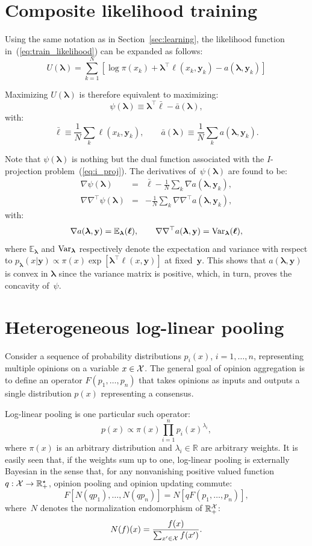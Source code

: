\documentclass[english]{scrartcl}
\def\y{{\mathbf{y}}}
\newcommand{\blambda}{{\boldsymbol{\lambda}}}
\newcommand{\bell}{{\boldsymbol{\ell}}}
\newcommand{\E}{\mathbb{E}}
\begin{document}
\section{Composite likelihood training}
\label{app:training}

Using the same notation as in Section~\ref{sec:learning}, the likelihood function in~(\ref{eq:train_likelihood}) can be expanded as follows:
$$
U(\blambda) 
= \sum_{k=1}^N \left[
\log \pi(x_k) + \blambda^\top \bell(x_k, \y_k) - a(\blambda,\y_k)
\right]
$$

Maximizing $U(\blambda)$ is therefore equivalent to maximizing: 
$$
\psi(\blambda) \equiv \blambda^\top \bar{\bell} - \bar{a}(\blambda), 
$$
with:
$$
\bar{\bell} \equiv \frac{1}{N} \sum_k \bell(x_k,\y_k),
\qquad
\bar{a}(\blambda) \equiv \frac{1}{N} \sum_k a(\blambda,\y_k).
$$

Note that $\psi(\blambda)$ is nothing but the dual function associated with the $I$-projection problem~(\ref{eq:i_proj}). The derivatives of~$\psi(\blambda)$ are found to be:
\begin{eqnarray*}
\nabla\psi(\blambda)
 & = & \bar{\bell} - \frac{1}{N} \sum_k \nabla a(\blambda,\y_k), \\
\nabla\nabla^\top\psi(\blambda)
 & = & - \frac{1}{N} \sum_k \nabla \nabla^\top a(\blambda,\y_k),
\end{eqnarray*}
with:
$$
\nabla a(\blambda,\y) = \E_{\blambda}(\bell),
\qquad
\nabla \nabla^\top a(\blambda,\y) = {\rm Var}_{\blambda}(\bell),
$$
where $\E_{\blambda}$ and ${\rm Var}_{\blambda}$ respectively denote the expectation and variance with respect to $p_\blambda(x|\y)\propto \pi(x)\exp[\blambda^\top \bell(x,\y)]$ at fixed~$\y$. This shows that $a(\blambda,\y)$ is convex in $\blambda$ since the variance matrix is positive, which, in turn, proves the concavity of~$\psi$.



\section{Heterogeneous log-linear pooling}
\label{app:hetero}

Consider a sequence of probability distributions $p_i(x)$, $i=1,\ldots,n$, representing multiple opinions on a variable $x\in{\cal X}$. The general goal of opinion aggregation is to define an operator $F(p_1,\ldots,p_n)$ that takes opinions as inputs and outputs a single distribution $p(x)$ representing a consensus.

Log-linear pooling \cite{Genest-86} is one particular such operator:
$$
p(x)\propto \pi(x) \prod_{i=1}^n p_i(x)^{\lambda_i},
$$
where $\pi(x)$ is an arbitrary distribution and $\lambda_i\in\mathbb{R}$ are arbitrary weights. It is easily seen that, if the weights sum up to one, log-linear pooling is externally Bayesian in the sense that, for any nonvanishing positive valued function $q:{\cal X}\to \mathbb{R}^\star_+$, opinion pooling and opinion updating commute:
$$
F[N(q p_1), \ldots, N(q p_n)]
=
N[q F(p_1,\ldots, p_n)],
$$
where~$N$ denotes the normalization endomorphism of $\mathbb{R}_+^{\cal X}$:
$$
N(f)(x) = \frac{f(x)}{\sum_{x'\in{\cal X}} f(x')}
.
$$
\end{document}
